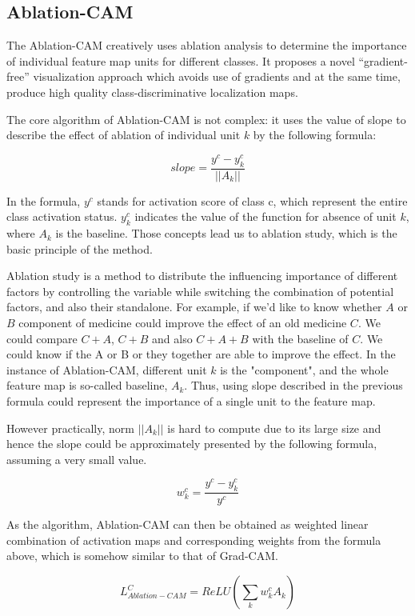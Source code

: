 \documentclass[conference]{IEEEtran}
\begin{document}
	\subsection{Ablation-CAM}
	
	The Ablation-CAM creatively uses ablation analysis to determine the importance of individual feature map units for different classes. It proposes a novel “gradient-free” visualization approach which avoids use of gradients and at the same time, produce high quality class-discriminative localization maps.\par
	
	The core algorithm of Ablation-CAM is not complex: it uses the value of slope to describe the effect of ablation of individual unit $k$ by the following formula:
	
	$$slope = \frac{y^c-y^c_k}{||A_k||}$$
	
	In the formula, $y^c$ stands for activation score of class c, which represent the entire class activation status. $y^c_k$ indicates the value of the function for absence of unit $k$, where $A_k$ is the baseline. Those concepts lead us to ablation study, which is the basic principle of the method.\par
	Ablation study is a method to distribute the influencing importance of different factors by controlling the variable while switching the combination of potential factors, and also their standalone. For example, if we'd like to know whether $A$ or $B$ component of medicine could improve the effect of an old medicine $C$. We could compare $C+A$, $C+B$ and also $C+A+B$ with the baseline of $C$. We could know if the A or B or they together are able to improve the effect. In the instance of Ablation-CAM, different unit $k$ is the "component", and the whole feature map is so-called baseline, $A_k$. Thus, using slope described in the previous formula could represent the importance of a single unit to the feature map.\par
	However practically, norm $||A_k||$ is hard to compute due to its large size and hence the slope could be approximately presented by the following formula, assuming a very small value.
	
	$$w^c_k = \frac{y^c-y^c_k}{y^c}$$
	
	As the algorithm, Ablation-CAM can then be obtained as weighted linear combination of activation maps and corresponding weights from the formula above, which is somehow similar to that of Grad-CAM.
	
	$$L^C_{Ablation-CAM}=ReLU(\sum_k {w^c_k}{A_k})$$
	
\end{document}
